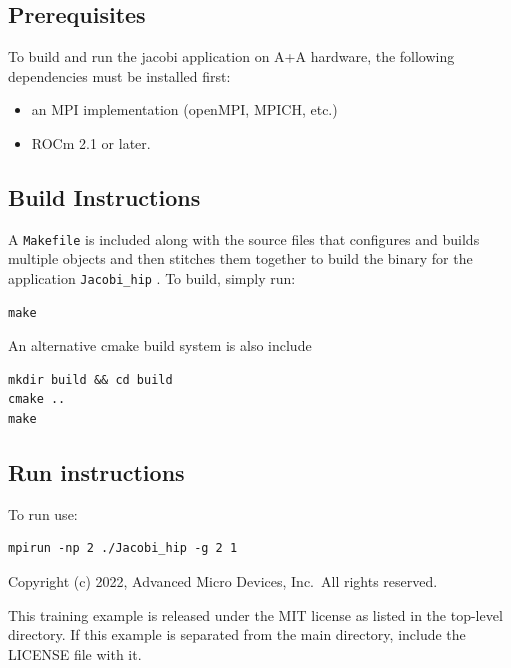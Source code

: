 \documentclass[
]{article}
\providecommand{\tightlist}{%
  \setlength{\itemsep}{0pt}\setlength{\parskip}{0pt}}
\let\oldtexttt\texttt
\renewcommand{\texttt}[1]{
  \colorbox{Light}{\oldtexttt{#1}}
}
\providecommand{\tightlist}{%
  \setlength{\itemsep}{0pt}\setlength{\parskip}{0pt}}
\begin{document}
\hypertarget{prerequisites}{%
\subsection{Prerequisites}\label{prerequisites}}

To build and run the jacobi application on A+A hardware, the following
dependencies must be installed first:

\begin{itemize}
\tightlist
\item
  an MPI implementation (openMPI, MPICH, etc.)
\item
  ROCm 2.1 or later.
\end{itemize}

\hypertarget{build-instructions}{%
\subsection{Build Instructions}\label{build-instructions}}

A \texttt{Makefile} is included along with the source files that
configures and builds multiple objects and then stitches them together
to build the binary for the application \texttt{Jacobi\_hip}. To build,
simply run:

\begin{verbatim}
make
\end{verbatim}

An alternative cmake build system is also include

\begin{verbatim}
mkdir build && cd build
cmake ..
make
\end{verbatim}

\hypertarget{run-instructions-1}{%
\subsection{Run instructions}\label{run-instructions-1}}

To run use:

\begin{verbatim}
mpirun -np 2 ./Jacobi_hip -g 2 1
\end{verbatim}

\pagebreak

Copyright (c) 2022, Advanced Micro Devices, Inc.~All rights reserved.

This training example is released under the MIT license as listed in the
top-level directory. If this example is separated from the main
directory, include the LICENSE file with it.
\end{document}
